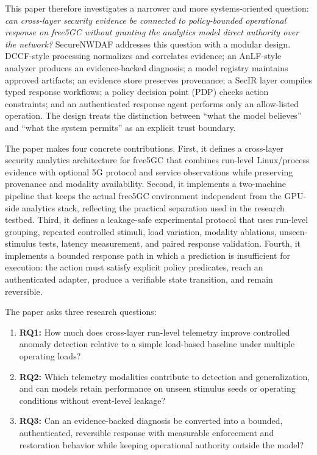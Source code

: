 \documentclass[sigconf,review]{acmart}
\begin{document}
This paper therefore investigates a narrower and more systems-oriented question: \emph{can cross-layer security evidence be connected to policy-bounded operational response on free5GC without granting the analytics model direct authority over the network?} SecureNWDAF addresses this question with a modular design. DCCF-style processing normalizes and correlates evidence; an AnLF-style analyzer produces an evidence-backed diagnosis; a model registry maintains approved artifacts; an evidence store preserves provenance; a SecIR layer compiles typed response workflows; a policy decision point (PDP) checks action constraints; and an authenticated response agent performs only an allow-listed operation. The design treats the distinction between ``what the model believes'' and ``what the system permits'' as an explicit trust boundary.

The paper makes four concrete contributions. First, it defines a cross-layer security analytics architecture for free5GC that combines run-level Linux/process evidence with optional 5G protocol and service observations while preserving provenance and modality availability. Second, it implements a two-machine pipeline that keeps the actual free5GC environment independent from the GPU-side analytics stack, reflecting the practical separation used in the research testbed. Third, it defines a leakage-safe experimental protocol that uses run-level grouping, repeated controlled stimuli, load variation, modality ablations, unseen-stimulus tests, latency measurement, and paired response validation. Fourth, it implements a bounded response path in which a prediction is insufficient for execution: the action must satisfy explicit policy predicates, reach an authenticated adapter, produce a verifiable state transition, and remain reversible.

The paper asks three research questions:
\begin{enumerate}[leftmargin=*]
\item \textbf{RQ1:} How much does cross-layer run-level telemetry improve controlled anomaly detection relative to a simple load-based baseline under multiple operating loads?
\item \textbf{RQ2:} Which telemetry modalities contribute to detection and generalization, and can models retain performance on unseen stimulus seeds or operating conditions without event-level leakage?
\item \textbf{RQ3:} Can an evidence-backed diagnosis be converted into a bounded, authenticated, reversible response with measurable enforcement and restoration behavior while keeping operational authority outside the model?
\end{enumerate}
\end{document}
